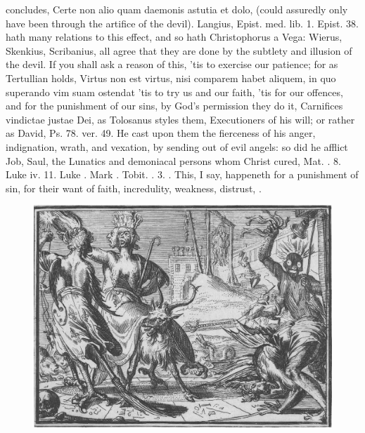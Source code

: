 {{concludes, Certe non alio quam daemonis astutia et dolo, (could
assuredly only have been through the artifice of the devil). Langius,
Epist. med. lib. 1. Epist. 38. hath many relations to this effect, and
so hath Christophorus a Vega: Wierus, Skenkius, Scribanius, all agree
that they are done by the subtlety and illusion of the devil. If you
shall ask a reason of this, 'tis to exercise our patience; for as
Tertullian holds, Virtus non est virtus, nisi comparem habet
aliquem, in quo superando vim suam ostendat 'tis to try us and our
faith, 'tis for our offences, and for the punishment of our sins, by
God's permission they do it, Carnifices vindictae justae Dei, as
Tolosanus styles them, Executioners of his will; or rather as
David, Ps. 78. ver. 49. He cast upon them the fierceness of his anger,
indignation, wrath, and vexation, by sending out of evil angels: so did
he afflict Job, Saul, the Lunatics and demoniacal persons whom Christ
cured, Mat. . 8. Luke iv. 11. Luke . Mark . Tobit. . 3. \etc{}.
This, I say, happeneth for a punishment of sin, for their want of
faith, incredulity, weakness, distrust, \etc{}.

\begin{figure}[p]
  \begingroup
  \centering
  \includegraphics[keepaspectratio,width=\textwidth]{figures/DeHorlende-small.jpg}
  \label{fig:dehorlende}
\end{figure}

\clearpage{}
\thispagestyle{titleontop}

}}
